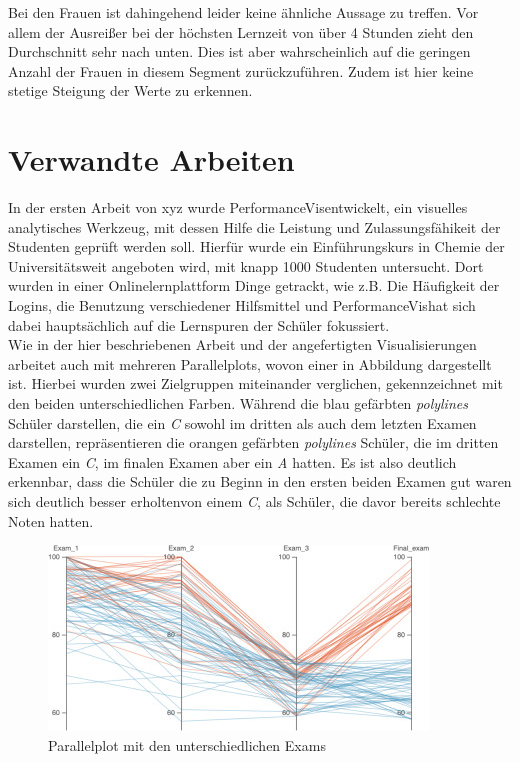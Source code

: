 \documentclass[usegeometry=true]{scrartcl}
\begin{document}
\noindent Bei den Frauen ist dahingehend leider keine ähnliche Aussage zu treffen. Vor allem der Ausreißer bei der höchsten Lernzeit von über 4 Stunden zieht den Durchschnitt sehr nach unten. Dies ist aber wahrscheinlich auf die geringen Anzahl der Frauen in diesem Segment zurückzuführen. Zudem ist hier keine stetige Steigung der Werte zu erkennen. \pagebreak




\section{Verwandte Arbeiten}
In der ersten Arbeit von xyz wurde \glqq PerformanceVis\grqq entwickelt, ein visuelles analytisches Werkzeug, mit dessen Hilfe die Leistung und Zulassungsfähikeit der Studenten geprüft werden soll. Hierfür wurde ein Einführungskurs in Chemie der Universitätsweit angeboten wird, mit knapp 1000 Studenten untersucht. Dort wurden in einer Onlinelernplattform Dinge getrackt, wie z.B. Die Häufigkeit der Logins, die Benutzung verschiedener Hilfsmittel und \glqq PerformanceVis\grqq hat sich dabei hauptsächlich auf die Lernspuren der Schüler fokussiert.\\

\noindent Wie in der hier beschriebenen Arbeit und der angefertigten Visualisierungen arbeitet auch \cite{Deng19} mit mehreren Parallelplots, wovon einer in Abbildung dargestellt ist. Hierbei wurden zwei Zielgruppen miteinander verglichen, gekennzeichnet mit den beiden unterschiedlichen Farben. Während die blau gefärbten \textit{polylines} Schüler darstellen, die ein \textit{C} sowohl im dritten als auch dem letzten Examen darstellen, repräsentieren die orangen gefärbten \textit{polylines} Schüler, die im dritten Examen ein \textit{C}, im finalen Examen aber ein \textit{A} hatten. Es ist also deutlich erkennbar, dass die Schüler die zu Beginn in den ersten beiden Examen gut waren sich deutlich besser \glqq erholten\grqq von einem \textit{C}, als Schüler, die davor bereits schlechte Noten hatten.\\






\begin{figure}[h]
\begin{center}
	\includegraphics[scale=1.3]{ParallelQuelle1.jpg}
	\caption{Parallelplot mit den unterschiedlichen \glqq Exams\grqq}
	\label{Quelle1}
\end{center}
\end{figure}
\end{document}

